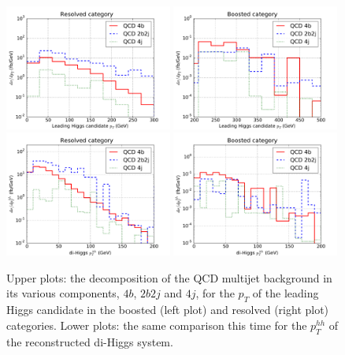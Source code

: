 \begin{figure}[t]
\begin{center}
 \includegraphics[width=0.49\textwidth]{plots/pt_H0_C2_res_back.pdf}
 \includegraphics[width=0.49\textwidth]{plots/pt_H0_C2_boost_back.pdf}
   \includegraphics[width=0.49\textwidth]{plots/pt_HH_C2_res_back.pdf}
  \includegraphics[width=0.49\textwidth]{plots/pt_HH_C2_boost_back.pdf}
  \caption{\small
    Upper plots: the decomposition of the QCD multijet background in its various
    components, $4b$, $2b2j$ and $4j$, for the $p_T$ of the leading
    Higgs candidate in the boosted (left plot) and resolved (right plot) categories.
    Lower plots: the same comparison this time for the $p_T^{hh}$ of the
    reconstructed di-Higgs system.
}
\label{fig:histoBack}
\end{center}
\end{figure}

